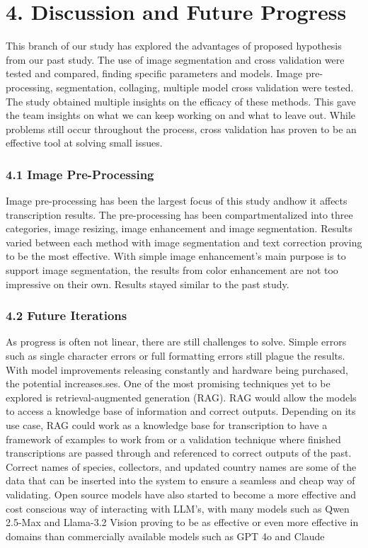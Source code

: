\documentclass{article}
\begin{document}
\section*{4. Discussion and Future Progress}
This branch of our study has explored the advantages of proposed hypothesis from our past study. The use of image segmentation and cross validation were tested and compared, finding specific parameters and models. Image pre-processing, segmentation, collaging, multiple model cross validation were tested. The study obtained multiple insights on the efficacy of these methods. This gave the team insights on what we can keep working on and what to leave out. While problems still occur throughout the process, cross validation has proven to be an effective tool at solving small issues.  

\subsubsection*{4.1 Image Pre-Processing}
Image pre-processing has been the largest focus of this study andhow it affects transcription results. The pre-processing has been compartmentalized into three categories, image resizing, image enhancement and image segmentation. Results varied between each method with image segmentation and text correction proving to be the most effective. With simple image enhancement’s main purpose is to support image segmentation, the results from color enhancement are not too impressive on their own. Results stayed similar to the past study. 

\subsubsection*{4.2 Future Iterations}
As progress is often not linear, there are still challenges to solve. Simple errors such as single character errors or full formatting errors still plague the results. With model improvements releasing constantly and hardware being purchased, the potential increases.ses. One of the most promising techniques yet to be explored is retrieval-augmented generation (RAG). RAG would allow the models to access a knowledge base of information and correct outputs. Depending on its use case, RAG could work as a knowledge base for transcription to have a framework of examples to work from or a validation technique where finished transcriptions are passed through and referenced to correct outputs of the past. Correct names of species, collectors, and updated country names are some of the data that can be inserted into the system to ensure a seamless and cheap way of validating. Open source models have also started to become a more effective and cost conscious way of interacting with LLM's, with many models such as Qwen 2.5-Max and Llama-3.2 Vision proving to be as effective or even more effective in domains than commercially available models such as GPT 4o and Claude
\end{document}
